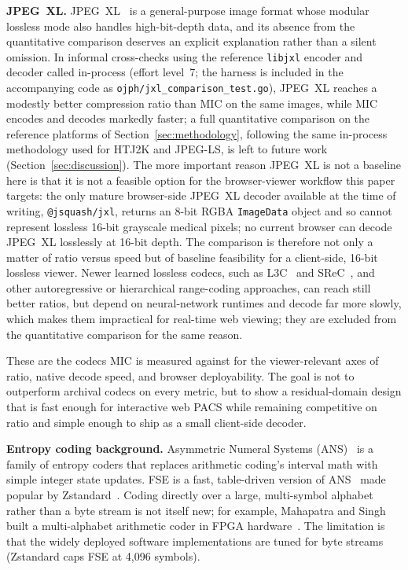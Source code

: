 \documentclass[journal]{IEEEtran}
\begin{document}
\textbf{JPEG~XL.} JPEG~XL~\cite{jpegxl} is a general-purpose image format
whose modular lossless mode also handles high-bit-depth data, and its absence
from the quantitative comparison deserves an explicit explanation rather than
a silent omission. In informal cross-checks using the reference \texttt{libjxl}
encoder and decoder called in-process (effort level~7; the harness is included
in the accompanying code as \texttt{ojph/jxl\_comparison\_test.go}), JPEG~XL
reaches a modestly better compression ratio than MIC on the same images, while
MIC encodes and decodes markedly faster; a full quantitative comparison on the
reference platforms of Section~\ref{sec:methodology}, following the same
in-process methodology used for HTJ2K and JPEG-LS, is left to future work
(Section~\ref{sec:discussion}). The more important reason JPEG~XL is not a
baseline here is that it is not a feasible option for the browser-viewer
workflow this paper targets: the only mature browser-side JPEG~XL decoder
available at the time of writing, \texttt{@jsquash/jxl}, returns an 8-bit RGBA
\texttt{ImageData} object and so cannot represent lossless 16-bit grayscale
medical pixels; no current browser can decode JPEG~XL losslessly at 16-bit
depth. The comparison is therefore not only a matter of ratio versus speed but
of baseline feasibility for a client-side, 16-bit lossless viewer. Newer
learned lossless codecs, such as L3C~\cite{mentzer2019l3c} and
SReC~\cite{cao2020srec}, and other autoregressive or hierarchical
range-coding approaches, can reach still better ratios, but depend on
neural-network runtimes and decode far more slowly, which makes them
impractical for real-time web viewing; they are excluded from the
quantitative comparison for the same reason.

These are the codecs MIC is measured against for the viewer-relevant axes of
ratio, native decode speed, and browser deployability. The goal is not to
outperform archival codecs on every metric, but to show a residual-domain design
that is fast enough for interactive web PACS while remaining competitive on
ratio and simple enough to ship as a small client-side decoder.

\textbf{Entropy coding background.} Asymmetric Numeral Systems
(ANS)~\cite{duda2009,duda2013} is a family of entropy coders that replaces
arithmetic coding's interval math with simple integer state updates. FSE is a
fast, table-driven version of ANS~\cite{fse} made popular by
Zstandard~\cite{rfc8878}. Coding directly over a large, multi-symbol alphabet
rather than a byte stream is not itself new; for example, Mahapatra and Singh
built a multi-alphabet arithmetic coder in FPGA hardware~\cite{mahapatra2007}.
The limitation is that the widely deployed software implementations are tuned
for byte streams (Zstandard caps FSE at 4,096 symbols).
\end{document}
